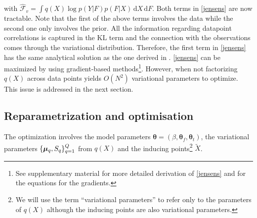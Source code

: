 \documentclass{article} %
\begin{document}
%
with $\hat{\mathcal{F}}_v =\int q(X) \log p( Y | F ) p( F | X) \,
\mathrm{d} X \,\mathrm{d}F$. Both terms in \eqref{jensens} are now
tractable. Note that the first of the above terms involves the data while
the second one only involves the prior. All the information regarding
datapoint correlations is captured in the $\text{KL}$ term and the
connection with the observations comes through the variational
distribution. Therefore, the first term in \eqref{jensens} has the
same analytical solution as the one derived in \cite{BayesianGPLVM}.
%
\eqref{jensens} can be maximized by using gradient-based
methods\footnote{See supplementary material for more detailed
  derivation of \eqref{jensens} and for the equations for the
  gradients.}. However, when not factorizing $q(X)$ across data points
yields $O(N^2)$ variational parameters to optimize. 
This issue is addressed in the next section.



\subsection{Reparametrization and optimisation \label{optimisation}} 

The optimization involves the model parameters 
$\boldsymbol \theta = (\beta, \boldsymbol \theta_f, \boldsymbol \theta_t)$, 
the variational parameters $\{ \boldsymbol \mu_q, S_q \}_{q=1}^Q$ from $q(X)$ and the inducing points\footnote{We will use the term ``variational parameters'' to refer only to the parameters of $q(X)$ although the inducing points are also variational parameters.} $\tilde{X}$.
\end{document}
